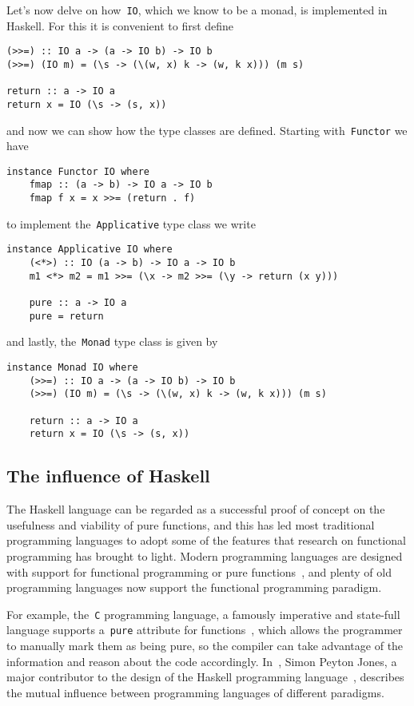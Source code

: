 \documentclass[../TFG.tex]{subfiles}
\begin{document}
Let's now delve on how~\texttt{IO}, which we know to be a monad, is
implemented in Haskell. For this it is convenient to first define
\begin{verbatim}
(>>=) :: IO a -> (a -> IO b) -> IO b
(>>=) (IO m) = (\s -> (\(w, x) k -> (w, k x))) (m s)

return :: a -> IO a
return x = IO (\s -> (s, x))
\end{verbatim}
and now we can show how the type classes are defined. Starting
with~\texttt{Functor} we have
\begin{verbatim}
instance Functor IO where
    fmap :: (a -> b) -> IO a -> IO b
    fmap f x = x >>= (return . f)
\end{verbatim}
to implement the~\texttt{Applicative} type class we write
\begin{verbatim}
instance Applicative IO where
    (<*>) :: IO (a -> b) -> IO a -> IO b
    m1 <*> m2 = m1 >>= (\x -> m2 >>= (\y -> return (x y)))

    pure :: a -> IO a
    pure = return
\end{verbatim}
and lastly, the~\texttt{Monad} type class is given by
\begin{verbatim}
instance Monad IO where
    (>>=) :: IO a -> (a -> IO b) -> IO b
    (>>=) (IO m) = (\s -> (\(w, x) k -> (w, k x))) (m s)

    return :: a -> IO a
    return x = IO (\s -> (s, x))
\end{verbatim}

\subsection{The influence of Haskell}
The Haskell language can be regarded as a successful proof of concept on the
usefulness and viability of pure functions, and this has led most traditional
programming languages to adopt some of the features that research on functional
programming has brought to light. Modern programming languages are designed with
support for functional programming or pure functions~\cite{enwiki:1023837642},
and plenty of old programming languages now support the functional programming
paradigm.

For example, the~\texttt{C} programming language, a famously imperative
and state-full language supports a~\texttt{pure} attribute for
functions~\cite{gccdoc:attributes}, which allows the programmer to manually mark
them as being pure, so the compiler can take advantage of the information and
reason about the code accordingly. In~\cite{haskell-useless}, Simon Peyton
Jones, a major contributor to the design of the Haskell programming
language~\cite{Simeone}, describes the mutual influence between programming
languages of different paradigms.
\end{document}
